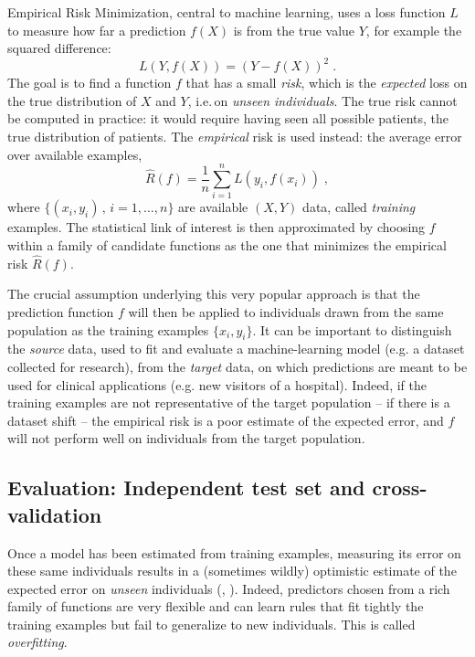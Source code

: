 \documentclass[twocolumn]{article}
\newcommand{\ie}{i.e.\,}
\begin{document}
Empirical Risk Minimization, central to machine learning,
uses a loss function $L$ to measure how far a
prediction $f(X)$ is from the true value $Y$, for example the squared
difference:
%
\begin{equation}
  L(Y, f(X)) = (Y - f(X))^2 \; .
\end{equation}
%
The goal is to find a function $f$ that has
 a small \emph{risk}, which is the \emph{expected} loss on
the true distribution of \(X\) and \(Y\), \ie on \emph{unseen individuals}.
The true risk cannot be computed in practice: it would require having seen all
possible patients, the true distribution of patients.
The \emph{empirical} risk is used instead: the average error over available
examples,
\begin{equation}
  \hat{R}(f) = \frac{1}{n}\sum_{i=1}^n L(y_i, f(x_i)) \; ,
\end{equation}
where $\{(x_i, y_i)\,,\,i=1,\dots,n\}$ are available $(X, Y)$ data,
called \emph{training} examples.
%
The statistical link of interest is then approximated by choosing $f$
 within a family of candidate functions as
the one that minimizes the empirical risk \(\hat{R}(f)\).

The crucial assumption underlying this very popular approach is that the
prediction function $f$ will then be applied to individuals drawn from the same
population as the training examples $\{x_i, y_i\}$. It can be important
to distinguish the \emph{source} data, used to fit and evaluate a machine-learning model (e.g. a dataset
collected for research), from the \emph{target} data, on which
predictions are meant to be used for clinical applications (e.g. new visitors of a hospital).
Indeed, if the training
examples are not representative of the target population -- if there is a
dataset shift -- the empirical risk is a poor estimate of the expected error,
and $f$ will not perform well on individuals from the target population.
%

\subsection{Evaluation: Independent test set and cross-validation}
\label{sec:org87b9cec}
Once a model has been estimated from training examples, measuring its error
on these same individuals results in a (sometimes wildly) optimistic estimate of
the expected error on \emph{unseen} individuals (\citet[Sec.
7.4]{friedman2001elements}, \citet[Sec. 1, ``Association vs Prediction'']{poldrack2020establishment}).
%
Indeed, predictors chosen from a rich family of functions are very
flexible and can learn rules that fit tightly the training examples but fail
to generalize to new individuals. This is called \emph{overfitting}.
\end{document}
